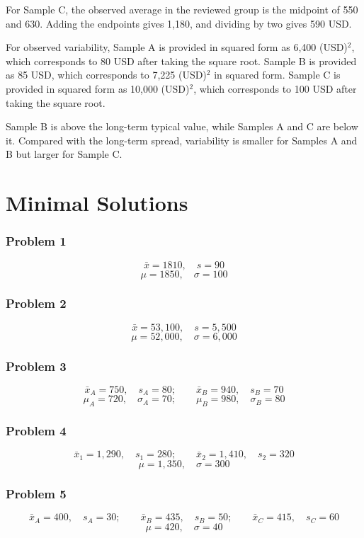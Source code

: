 \begin{ExamProblems}
		For Sample C, the observed average in the reviewed group is the midpoint of 550 and 630.
		Adding the endpoints gives 1,180, and dividing by two gives 590 USD.

		For observed variability, Sample A is provided in squared form as 6,400 (USD)$^2$, which corresponds to 80 USD after taking the square root.
		Sample B is provided as 85 USD, which corresponds to 7,225 (USD)$^2$ in squared form.
		Sample C is provided in squared form as 10,000 (USD)$^2$, which corresponds to 100 USD after taking the square root.

		Sample B is above the long-term typical value, while Samples A and C are below it.
		Compared with the long-term spread, variability is smaller for Samples A and B but larger for Sample C.


		\end{ExamProblems}

\part{Minimal Solutions}
\section*{Problem 1}
\[
\bar{x} = 1810,\quad s = 90
\]
\[
\mu = 1850,\quad \sigma = 100
\]

\section*{Problem 2}
\[
\bar{x} = 53,100,\quad s = 5,500
\]
\[
\mu = 52,000,\quad \sigma = 6,000
\]

\section*{Problem 3}
\[
\bar{x}_{A} = 750,\quad s_{A} = 80;\qquad \bar{x}_{B} = 940,\quad s_{B} = 70
\]
\[
\mu_{A} = 720,\quad \sigma_{A} = 70;\qquad \mu_{B} = 980,\quad \sigma_{B} = 80
\]

\section*{Problem 4}
\[
\bar{x}_{1} = 1,290,\quad s_{1} = 280;\qquad \bar{x}_{2} = 1,410,\quad s_{2} = 320
\]
\[
\mu = 1,350,\quad \sigma = 300
\]

\section*{Problem 5}
\[
\bar{x}_{A} = 400,\quad s_{A} = 30;\qquad \bar{x}_{B} = 435,\quad s_{B} = 50;\qquad \bar{x}_{C} = 415,\quad s_{C} = 60
\]
\[
\mu = 420,\quad \sigma = 40
\]

